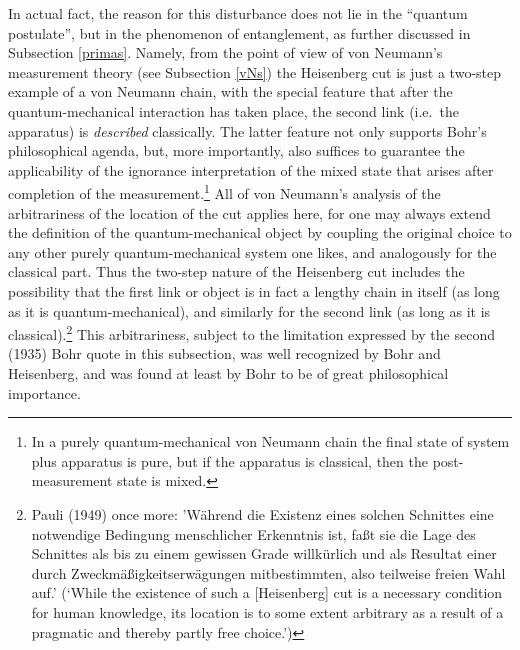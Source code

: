 \documentclass[12pt,titlepage]{article}
\begin{document}
In actual fact, the reason for this disturbance does not lie in the    ``quantum postulate'',  but in the phenomenon of entanglement, as further discussed in Subsection  \ref{primas}.
Namely, from the point of view of von Neumann's measurement theory (see Subsection \ref{vNs})
 the Heisenberg cut is just a two-step example of a von Neumann chain, with the special feature that after the quantum-mechanical interaction has taken place, the second link (i.e.\ the apparatus) is {\it described} classically.
The latter feature not only supports  Bohr's philosophical agenda, but, more importantly,
also suffices to guarantee the applicability of the ignorance interpretation of the mixed state that arises after completion of the measurement.\footnote{In a purely quantum-mechanical von Neumann chain the final state of system plus apparatus is pure, but if the
apparatus  is classical, then  the post-measurement state is mixed.} 
 All of von Neumann's analysis of the arbitrariness of the location of the cut applies here, for  one may always extend the definition of the quantum-mechanical object by coupling the original choice to any other purely quantum-mechanical system one likes, and analogously for the classical part. Thus the two-step nature of the Heisenberg cut includes the possibility that the first link or object is in fact a lengthy chain in itself (as long as it is quantum-mechanical), and similarly for the second link (as long as it is classical).\footnote{\label{PFN2} Pauli (1949) once more: 'W\"{a}hrend die {\sc Existenz} eines solchen Schnittes eine notwendige Bedingung menschlicher Erkenntnis ist, fa\ss t sie die {\sc Lage} des Schnittes als bis zu einem gewissen Grade willk\"{u}rlich und als Resultat einer durch Zweckm\"{a}\ss igkeitserw\"{a}gungen mitbestimmten, also teilweise freien Wahl auf.'
(`While the {\sc existence} of such a [Heisenberg] cut is a necessary condition for human knowledge,
its {\sc location} is to some extent arbitrary as a result of a pragmatic and thereby partly 
free choice.')} This arbitrariness, subject to the limitation expressed by the second (1935) Bohr quote in this subsection, was well recognized by Bohr and Heisenberg, and was found at least by Bohr to be of great philosophical importance. 
\end{document}
